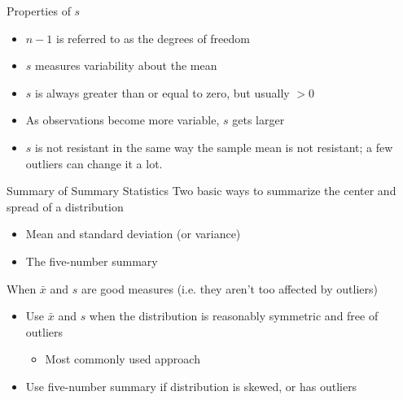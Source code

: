 \documentclass{beamer}
\begin{document}
\begin{frame}{Properties of $s$}
	
	\begin{itemize}
		\item $n-1$ is referred to as the degrees of freedom
		\item $s$ measures variability about the mean
		\item $s$ is always greater than or equal to zero, but usually $> 0$
		\item As observations become more variable, $s$ gets larger
		\item $s$ is not resistant in the same way the sample mean is not resistant; a few outliers can change it a lot.
	\end{itemize}
	
\end{frame}

\begin{frame}{Summary of Summary Statistics}
	Two basic ways to summarize the center and spread of a distribution
	\begin{itemize}
		\item Mean and standard deviation (or variance)
		\item The five-number summary
	\end{itemize}

	When $\bar{x}$ and $s$ are good measures (i.e. they aren't too affected by outliers)
	\begin{itemize}
		\item Use $\bar{x}$ and $s$ when the distribution is reasonably symmetric and free of outliers
		      \begin{itemize}
		      	\item Most commonly used approach
		      \end{itemize}
		\item Use five-number summary if distribution is skewed, or has outliers
	\end{itemize}
\end{frame}
\end{document}
